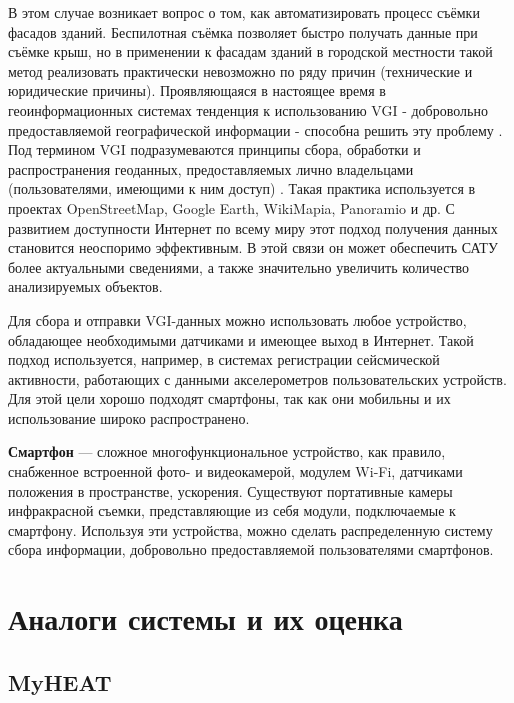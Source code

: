 	В этом случае возникает вопрос о том, как автоматизировать процесс съёмки фасадов зданий. Беспилотная съёмка позволяет быстро получать данные при съёмке крыш, но в применении к фасадам зданий в городской местности такой метод реализовать практически невозможно по ряду причин (технические и юридические причины). Проявляющаяся в настоящее время в геоинформационных системах тенденция к использованию {VGI} - добровольно предоставляемой географической информации - способна решить эту проблему \cite{problem:citizens-as-sensors}. Под термином {VGI} подразумеваются принципы сбора, обработки и распространения геоданных, предоставляемых лично владельцами (пользователями, имеющими к ним доступ) \cite{problem:vgi}. Такая практика используется в проектах {OpenStreetMap}, {Google Earth}, {WikiMapia}, {Panoramio} и др. С развитием доступности Интернет по всему миру этот подход получения данных становится неоспоримо эффективным. В этой связи он может обеспечить САТУ более актуальными сведениями, а также значительно увеличить количество анализируемых объектов. 

	Для сбора и отправки {VGI}-данных можно использовать любое устройство, обладающее необходимыми датчиками и имеющее выход в Интернет.  Такой подход используется, например, в системах регистрации сейсмической активности, работающих с данными акселерометров пользовательских устройств. Для этой цели хорошо подходят смартфоны, так как они мобильны и их использование широко распространено.

	\textbf{Смартфон} --- сложное многофункциональное устройство, как правило, снабженное встроенной фото- и видеокамерой, модулем {Wi-Fi}, датчиками положения в пространстве, ускорения. Существуют портативные камеры инфракрасной съемки, представляющие из себя модули, подключаемые к смартфону. Используя эти устройства, можно сделать распределенную систему сбора информации, добровольно предоставляемой пользователями смартфонов. 


\section{Аналоги системы и их оценка}

\subsection{MyHEAT}

